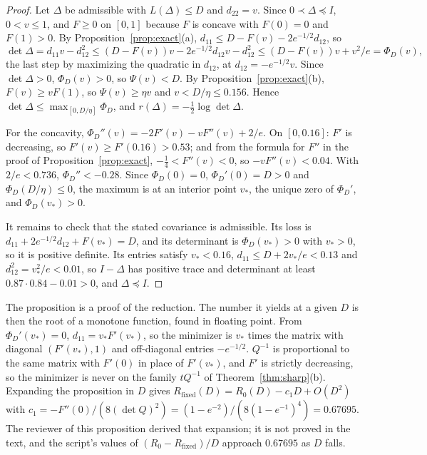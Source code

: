 \documentclass[11pt,onecolumn]{IEEEtran}
\newcommand{\Rfix}{R_{\mathrm{fixed}}}
\begin{document}
\begin{proof}
Let $\Delta$ be admissible with $L(\Delta)\le D$ and $d_{22}=v$. Since
$0\prec\Delta\preceq I$, $0<v\le1$, and $F\ge0$ on $[0,1]$ because $F$ is concave with
$F(0)=0$ and $F(1)>0$. By
Proposition~\ref{prop:exact}(a), $d_{11}\le D-F(v)-2e^{-1/2}d_{12}$, so
\[
\det\Delta=d_{11}v-d_{12}^2\le(D-F(v))v-2e^{-1/2}d_{12}v-d_{12}^2\le(D-F(v))v+v^2/e
=\Phi_D(v),
\]
the last step by maximizing the quadratic in $d_{12}$, at $d_{12}=-e^{-1/2}v$. Since
$\det\Delta>0$, $\Phi_D(v)>0$, so $\Psi(v)<D$. By Proposition~\ref{prop:exact}(b),
$F(v)\ge vF(1)$, so $\Psi(v)\ge\eta v$ and $v<D/\eta\le0.156$. Hence
$\det\Delta\le\max_{[0,D/\eta]}\Phi_D$, and $r(\Delta)=-\tfrac12\log\det\Delta$.

For the concavity, $\Phi_D''(v)=-2F'(v)-vF''(v)+2/e$. On $[0,0.16]$: $F'$ is
decreasing, so $F'(v)\ge F'(0.16)>0.53$; and from the formula for $F''$ in the proof of
Proposition~\ref{prop:exact}, $-\tfrac14<F''(v)<0$, so $-vF''(v)<0.04$. With $2/e<0.736$,
$\Phi_D''<-0.28$. Since $\Phi_D(0)=0$, $\Phi_D'(0)=D>0$ and
$\Phi_D(D/\eta)\le0$, the maximum is at an interior point $v_*$, the unique zero of
$\Phi_D'$, and $\Phi_D(v_*)>0$.

It remains to check that the stated covariance is admissible. Its loss is
$d_{11}+2e^{-1/2}d_{12}+F(v_*)=D$, and its determinant is $\Phi_D(v_*)>0$ with
$v_*>0$, so it is positive definite. Its entries satisfy $v_*<0.16$,
$d_{11}\le D+2v_*/e<0.13$ and $d_{12}^2=v_*^2/e<0.01$, so $I-\Delta$ has positive trace
and determinant at least $0.87\cdot0.84-0.01>0$, and $\Delta\preceq I$.
\end{proof}

The proposition is a proof of the reduction. The number it yields at a given $D$ is then
the root of a monotone function, found in floating point. From $\Phi_D'(v_*)=0$, $d_{11}=v_*F'(v_*)$, so the minimizer is $v_*$ times the matrix
with diagonal $(F'(v_*),1)$ and off-diagonal entries $-e^{-1/2}$. $Q^{-1}$ is proportional
to the same matrix with $F'(0)$ in place of $F'(v_*)$, and $F'$ is strictly decreasing, so
the minimizer is never on the family $tQ^{-1}$ of Theorem~\ref{thm:sharp}(b). Expanding
the proposition in $D$ gives $\Rfix(D)=R_0(D)-c_1D+O(D^2)$ with
$c_1=-F''(0)/(8(\det Q)^2)=(1-e^{-2})/(8(1-e^{-1})^4)=0.67695$. The reviewer of this
proposition derived that expansion; it is not proved in the text, and the script's values
of $(R_0-\Rfix)/D$ approach $0.67695$ as $D$ falls.
\end{document}
